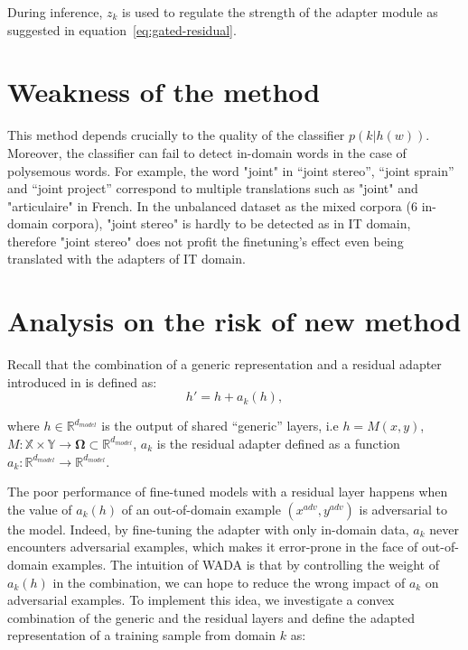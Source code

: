 \documentclass[12pt,times,a4paper,twoside]{article}
\newcommand{\fyTodo}[1]{\Todo[FY:]{\textcolor{orange}{#1}}}
\newcommand{\fyDone}[1]{\done[FY]\Todo[FY:]{\textcolor{orange}{#1}}}
\theoremstyle{definition}
\newcommand{\R}{\ensuremath{\mathbb{R}}}
\begin{document}
During inference, $z_k$ is used to regulate the strength of the adapter module as suggested in equation~\ref{eq:gated-residual}.

\section*{Weakness of the method}

This method\fyTodo{Do not start with the weaknesses} depends crucially to the quality of the classifier $p(k|h(w))$. Moreover, the classifier can fail to detect in-domain words in the case of polysemous words. For example, the word "joint" in ``joint stereo'', ``joint sprain'' and ``joint project'' correspond to multiple translations such as "joint" and "articulaire" in French. In the unbalanced dataset as the mixed corpora (6 in-domain corpora),  "joint stereo" is hardly to be detected as in IT domain, therefore "joint stereo" does not profit the finetuning's effect even being translated with the adapters of IT domain.

\section*{Analysis on the risk of new method}

Recall that the combination of a generic representation and a residual adapter introduced in \citep{BapnaXX} is defined as:
\begin{equation}
  h' = h + a_k(h) \label{eq:residual-adapter},
\end{equation}

where $h \in \R^{d_{model}}$ is the output of shared ``generic'' layers, i.e $h=M(x,y)$, $M: \mathbb{X} \times \mathbb{Y} \rightarrow \mathbf{\Omega}\subset \R^{d_{model}}$, $a_k$ is the residual adapter defined as a function $a_k: \R^{d_{model}} \rightarrow \R^{d_{model}}$.\fyTodo{$\R^d$ might be enough.}

The poor performance of fine-tuned models with a residual layer happens when the value of $a_k(h)$ of an out-of-domain example $(x^{adv}, y^{adv})$ is adversarial to the model. Indeed, by fine-tuning the adapter with only in-domain data, $a_k$ never encounters adversarial examples, which makes it error-prone in the face of out-of-domain examples. The intuition of WADA is that by controlling the weight of $a_k(h)$ in the combination, we can hope to reduce the wrong impact of $a_k$ on adversarial examples. To implement this idea, we  investigate a convex combination\fyDone{Entre $h$ et $h + a h$} of the generic and the residual layers and define the adapted representation of a training sample from domain $k$ as: \fyTodo{Use real labels in equation}
\end{document}
